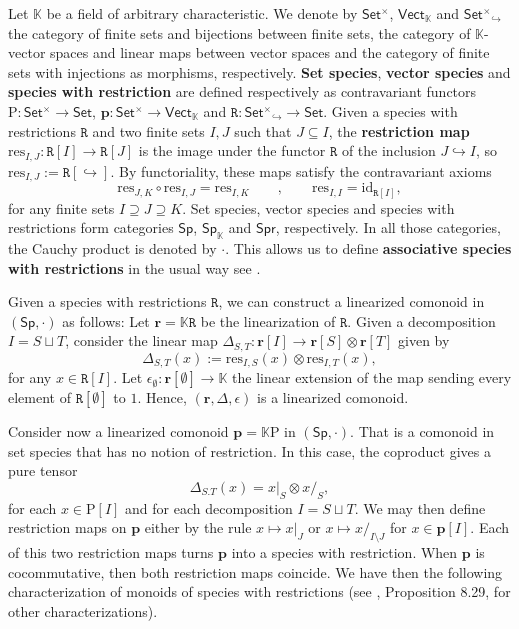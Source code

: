 \documentclass[submission]{FPSAC2023}
\theoremstyle{definition}
\DeclareMathOperator{\id}{id}
\newcommand{\Fset}{\mathsf{Set^{\times}}}
\newcommand{\Vect}{\mathsf{Vect}}
\newcommand{\Set}{\mathsf{Set}}
\newcommand{\Ss}{\mathsf{Sp}} %
\newcommand{\Spr}{\mathsf{Spr}} %
\newcommand{\rP}{\mathrm{P}}
\newcommand{\prR}{\mathtt{R}}
\newcommand{\tp}{\mathbf{p}}
\newcommand{\trr}{\mathbf{r}}
\begin{document}
Let $\mathbb{K}$ be a field of arbitrary characteristic. We denote by $\Fset$, $\Vect_{\mathbb{K}}$ and $\Fset_{\!\!\!\!\!\hookrightarrow}$ the category of finite sets and bijections between finite sets, the category of $\mathbb{K}$-vector spaces and linear maps between vector spaces and the category of finite sets with injections as morphisms, respectively. 
{\bf Set species}, {\bf vector species} and {\bf species with restriction} are defined respectively as contravariant functors $\rP: \Fset\to \Set$, $\tp:\Fset \to \Vect_{\mathbb{K}}$ and $\prR:\Fset_{\!\!\!\!\!\hookrightarrow} \to \Set$. Given a species with restrictions $\prR$ and two finite sets $I,J$ such that $J \subseteq I$, the {\bf restriction map} $\text{res}_{I,J}: \prR[I]\to \prR[J]$  is the image under the functor $\prR$ of the inclusion $J \hookrightarrow I$, so $\text{res}_{I,J}:=\prR[\hookrightarrow]$.
By functoriality, these maps satisfy the contravariant axioms
\begin{equation}\label{Axrestr}
    \text{res}_{J,K}\circ\text{res}_{I,J}=\text{res}_{I,K} \qquad , \qquad \text{res}_{I,I}=\text{id}_{\prR[I]},
\end{equation}
for any finite sets $I \supseteq J \supseteq K$. Set species, vector species and species with restrictions form  categories $\Ss$, $\Ss_{\mathbb{K}}$ and $\Spr$, respectively. In all those categories, the Cauchy product is denoted by $\cdot$.
This allows us to define \textbf{associative species with restrictions} in the usual way see \cite{Penaguiao2020}.

Given a species with restrictions $\prR$, we can construct a linearized comonoid in $(\Ss, \cdot)$ as follows: Let $\trr=\mathbb{K}\prR$ be the linearization of $\prR$. Given a decomposition $I=S \sqcup T$, consider the linear map $\Delta_{S,T}: \trr[I]\to \trr[S] \otimes \trr[T]$ given by
\begin{equation}\label{CoprodRestr}
\Delta_{S,T}(x):=\text{res}_{I,S}(x)\otimes \text{res}_{I,T}(x),
\end{equation}
for any $x \in \prR[I]$. Let $\epsilon_\emptyset: \trr[\emptyset]\to \mathbb{K}$ the linear extension of the map sending every element of $\prR[\emptyset]$ to $1$. Hence, $(\trr, \Delta, \epsilon)$ is a linearized comonoid.


Consider now a linearized comonoid $\tp=\mathbb{K}\rP$ in $(\Ss, \cdot)$. 
That is a comonoid in set species that has no notion of restriction.
In this case, the coproduct gives a pure tensor
\[\Delta_{S.T}(x)=x|_S \otimes x/_S,\]
for each $x \in \rP[I]$ and for each decomposition $I = S \sqcup T$. We may then define restriction maps on $\tp$ either by the rule $x\mapsto x|_J$ or $x\mapsto x/_{I\setminus J}$ for $x \in \tp[I]$. Each of this two restriction maps turns $\tp$ into a species with restriction. When $\tp$ is cocommutative, then both restriction maps coincide. We have then the following characterization of monoids of species with restrictions (see \cite{AM2010}, Proposition 8.29, for other characterizations).
\end{document}
